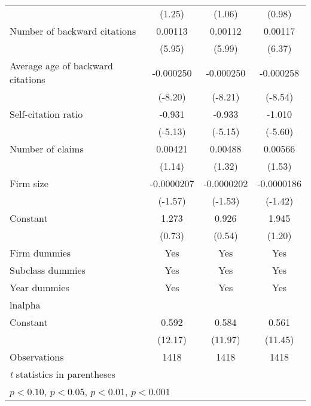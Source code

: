 \begin{table}[htbp]
\begin{tabular}{l*{3}{c}}
                    &      (1.25)         &      (1.06)         &      (0.98)         \\
\addlinespace
Number of backward citations&     0.00113\sym{***}&     0.00112\sym{***}&     0.00117\sym{***}\\
                    &      (5.95)         &      (5.99)         &      (6.37)         \\
\addlinespace
Average age of backward citations&   -0.000250\sym{***}&   -0.000250\sym{***}&   -0.000258\sym{***}\\
                    &     (-8.20)         &     (-8.21)         &     (-8.54)         \\
\addlinespace
Self-citation ratio &      -0.931\sym{***}&      -0.933\sym{***}&      -1.010\sym{***}\\
                    &     (-5.13)         &     (-5.15)         &     (-5.60)         \\
\addlinespace
Number of claims    &     0.00421         &     0.00488         &     0.00566         \\
                    &      (1.14)         &      (1.32)         &      (1.53)         \\
\addlinespace
Firm size           &  -0.0000207         &  -0.0000202         &  -0.0000186         \\
                    &     (-1.57)         &     (-1.53)         &     (-1.42)         \\
\addlinespace
Constant            &       1.273         &       0.926         &       1.945         \\
                    &      (0.73)         &      (0.54)         &      (1.20)         \\
\addlinespace
Firm dummies&Yes&Yes&Yes\\
\addlinespace
Subclass dummies&Yes&Yes&Yes\\
\addlinespace
Year dummies&Yes&Yes&Yes\\
\midrule
lnalpha             &                     &                     &                     \\
Constant            &       0.592\sym{***}&       0.584\sym{***}&       0.561\sym{***}\\
                    &     (12.17)         &     (11.97)         &     (11.45)         \\
\midrule
Observations        &        1418         &        1418         &        1418         \\
\bottomrule
\multicolumn{4}{l}{\footnotesize \textit{t} statistics in parentheses}\\
\multicolumn{4}{l}{\footnotesize \sym{+} \(p<0.10\), \sym{*} \(p<0.05\), \sym{**} \(p<0.01\), \sym{***} \(p<0.001\)}\\
\end{tabular}
\end{table}
